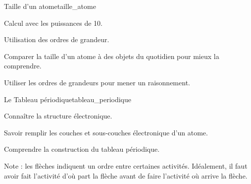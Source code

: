\begin{multicols}{2}
  \medskip
  \begin{activite}{Taille d'un atome}{taille_atome}
    \begin{prerequis}
      \item Calcul avec les puissances de 10.
      \item Utilisation des ordres de grandeur.
    \end{prerequis}
    \begin{objectifs}
      \item Comparer la taille d'un atome à des objets du quotidien pour mieux la comprendre.
      \item Utiliser les ordres de grandeurs pour mener un raisonnement.
    \end{objectifs}
  \end{activite}

  \medskip
  \begin{TP}{Le Tableau périodique}{tableau_periodique}
    \begin{prerequis}
      \item Connaître la structure électronique.
      \item Savoir remplir les couches et sous-couches électronique d'un atome.
    \end{prerequis}
    \begin{objectifs}
      \item Comprendre la construction du tableau périodique.
    \end{objectifs}
  \end{TP}
\end{multicols}

\vspace*{-2cm}

\vspace*{1.5cm}
Note : les flèches indiquent un ordre entre certaines activités.
Idéalement, il faut avoir fait l'activité d'où part la flèche avant de faire l'activité où arrive la flèche.


\newpage
\nomPrenomClasse
{}
\vspace*{12pt}

